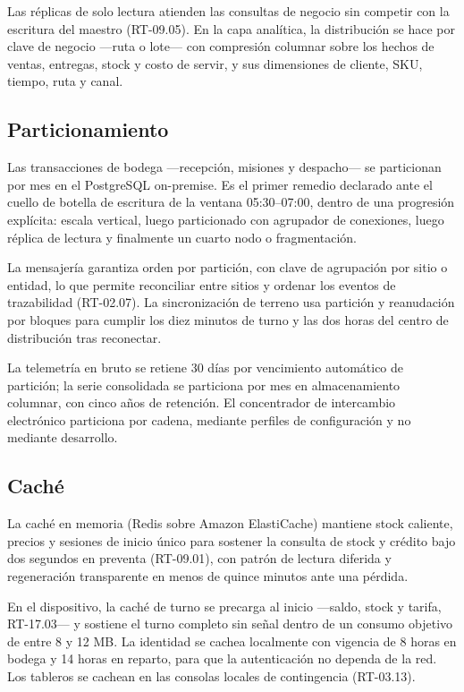Las réplicas de solo lectura atienden las consultas de negocio sin competir con
la escritura del maestro (RT-09.05).  En la capa analítica, la distribución se
hace por clave de negocio ---ruta o lote--- con compresión columnar sobre los
hechos de ventas, entregas, stock y costo de servir, y sus dimensiones de
cliente, SKU, tiempo, ruta y canal.

\subsection{Particionamiento}
\label{sec:particionamiento}

Las transacciones de bodega ---recepción, misiones y despacho--- se particionan
por mes en el PostgreSQL on-premise.  Es el primer remedio declarado ante el
cuello de botella de escritura de la ventana 05:30--07:00, dentro de una
progresión explícita: escala vertical, luego particionado con agrupador de
conexiones, luego réplica de lectura y finalmente un cuarto nodo o
fragmentación.

La mensajería garantiza orden por partición, con clave de agrupación por sitio
o entidad, lo que permite reconciliar entre sitios y ordenar los eventos de
trazabilidad (RT-02.07).  La sincronización de terreno usa partición y
reanudación por bloques para cumplir los diez minutos de turno y las dos horas
del centro de distribución tras reconectar.

La telemetría en bruto se retiene 30 días por vencimiento automático de
partición; la serie consolidada se particiona por mes en almacenamiento
columnar, con cinco años de retención.  El concentrador de intercambio
electrónico particiona por cadena, mediante perfiles de configuración y no
mediante desarrollo.

\subsection{Caché}
\label{sec:cache}

La caché en memoria (Redis sobre Amazon ElastiCache) mantiene stock caliente,
precios y sesiones de inicio único para sostener la consulta de stock y crédito
bajo dos segundos en preventa (RT-09.01), con patrón de lectura diferida y
regeneración transparente en menos de quince minutos ante una pérdida.

En el dispositivo, la caché de turno se precarga al inicio ---saldo, stock y
tarifa, RT-17.03--- y sostiene el turno completo sin señal dentro de un consumo
objetivo de entre 8 y 12 MB.  La identidad se cachea localmente con vigencia de
8 horas en bodega y 14 horas en reparto, para que la autenticación no dependa
de la red.  Los tableros se cachean en las consolas locales de contingencia
(RT-03.13).

